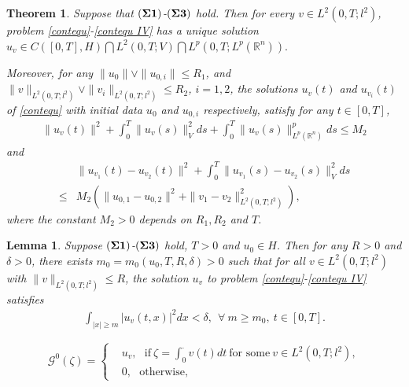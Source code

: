 \documentclass[10pt,a4paper]{amsart}
\newtheorem{theorem}{Theorem}
\newtheorem{lemma}{Lemma}
\def\geq{\geqslant}
\def\leq{\leqslant}
\begin{document}
\begin{theorem}\label{cewellposed}
  Suppose that $({\bf \Sigma 1})$-$({\bf \Sigma 3})$ hold.
  Then for every $v \in L^2(0,T; l^2)$,
  problem \eqref{contequ}-\eqref{contequ IV} has a unique solution
    $ u_v \in C([0,T], H) \bigcap L^2(0,T; V) \bigcap L^p(0,T; L^p(\mathbb{R}^n)). $

  Moreover, for any
      $\| u_{0} \| \vee \| u_{0,i} \| \leq R_1$,
  and $\| v \|_{L^2(0, T; l^2)} \vee \| v_i \|_{L^2(0, T; l^2)} \leq R_2$,
      $i = 1,2$,
  the solutions $u_v(t)$ and $u_{v_i}(t)$ of \eqref{contequ}
  with initial data $u_0$ and $u_{0,i}$ respectively,
  satisfy for any $t \in [0,T]$,
  \begin{align}\label{dceue}
      \| u_{v}(t) \|^2
      + \int_0^T \| u_v(s) \|_V^2 ds
      + \int_0^T \| u_v(s) \|_{L^p(\mathbb{R}^n)}^p ds
      \leq M_2
  \end{align}
  and
  \begin{align} \label{dcelip}
         & \| u_{v_1}(t) - u_{v_2}(t)
         \|^2
           + \int_0^T \| u_{v_1}(s) - u_{v_2}(s) \|_V^2 ds
             \nonumber\\
    \leq & M_2
               \left( \| u_{0,1} - u_{0,2} \|^2
                      + \| v_1 - v_2 \|^2_{L^2(0, T; l^2)}
               \right),
  \end{align}
  where the constant $M_2 > 0$ depends on $R_1, R_2$ and $T$.
\end{theorem}

\begin{lemma} \label{tailestim}
  Suppose   $({\bf \Sigma 1})$-$({\bf \Sigma 3})$ hold,
  $T>0$  and $ u_0 \in H$.
  Then for any $R > 0$ and $\delta > 0$, there exists $m_0 = m_0(u_0, T, R, \delta) > 0$ such that
  for all $v \in L^2(0, T; l^2)$ with $\| v \|_{L^2(0, T; l^2)} \leq R$,
  the solution $u_v$ to problem \eqref{contequ}-\eqref{contequ IV}
  satisfies
  \begin{align*}
      \int_{|x| \geq m} |u_v(t,x)|^2 dx < \delta,
        \ \ \forall\  m \geq m_0, \   t \in [0,T].
  \end{align*}
\end{lemma}

 \begin{equation}\label{G0}
    \mathcal{G}^0(\zeta)
    = \left\{
    \begin{array} {ll}
        & u_v, \ \ \  \text{if}\  \zeta = \int_{0}^{\cdot} v(t) dt \ \text{for\ some}\  v \in L^2(0,T; l^2),\\
        & 0,\ \ \  \text{otherwise},
    \end{array}
    \right.
 \end{equation}
\end{document}
